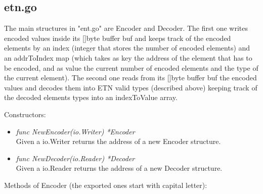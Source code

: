 \subsection{etn.go}

The main structures in "ent.go" are Encoder and Decoder. The first one writes encoded values inside its []byte buffer buf and keeps track of the encoded elements by an index (integer that stores the number of encoded elements) and an addrToIndex map (which takes as key the address of the element that has to be encoded, and as value the current number of encoded elements and the type of the current element). The second one reads from its []byte buffer buf the encoded values and decodes them into ETN valid types (described above) keeping track of the decoded elements types into an indexToValue array.

Constructors:

\begin{itemize}

	\item \emph{func NewEncoder(io.Writer) *Encoder}\\
	Given a io.Writer returns the address of a new Encoder structure.
	
	\item \emph{func NewDecoder(io.Reader) *Decoder}\\
	Given a io.Reader returns the address of a new Decoder structure.

\end{itemize}

Methods of Encoder (the exported ones start with capital letter):

